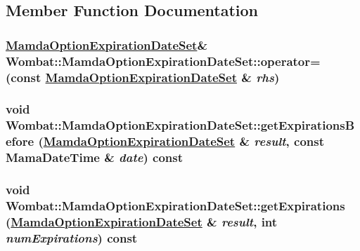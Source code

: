 \subsection{Member Function Documentation}
\hypertarget{classWombat_1_1MamdaOptionExpirationDateSet_44ae713d433431323e784c43f3305e84}{
\subsubsection[operator=]{\setlength{\rightskip}{0pt plus 5cm}\hyperlink{classWombat_1_1MamdaOptionExpirationDateSet}{Mamda\-Option\-Expiration\-Date\-Set}\& Wombat::Mamda\-Option\-Expiration\-Date\-Set::operator= (const \hyperlink{classWombat_1_1MamdaOptionExpirationDateSet}{Mamda\-Option\-Expiration\-Date\-Set} \& {\em rhs})}}
\label{classWombat_1_1MamdaOptionExpirationDateSet_44ae713d433431323e784c43f3305e84}


\hypertarget{classWombat_1_1MamdaOptionExpirationDateSet_a58c1ab06b95af9bbee919d6fe7b373a}{
\subsubsection[getExpirationsBefore]{\setlength{\rightskip}{0pt plus 5cm}void Wombat::Mamda\-Option\-Expiration\-Date\-Set::get\-Expirations\-Before (\hyperlink{classWombat_1_1MamdaOptionExpirationDateSet}{Mamda\-Option\-Expiration\-Date\-Set} \& {\em result}, const Mama\-Date\-Time \& {\em date}) const}}
\label{classWombat_1_1MamdaOptionExpirationDateSet_a58c1ab06b95af9bbee919d6fe7b373a}


\hypertarget{classWombat_1_1MamdaOptionExpirationDateSet_b756b2efe9defc35104d65ef398d378e}{
\subsubsection[getExpirations]{\setlength{\rightskip}{0pt plus 5cm}void Wombat::Mamda\-Option\-Expiration\-Date\-Set::get\-Expirations (\hyperlink{classWombat_1_1MamdaOptionExpirationDateSet}{Mamda\-Option\-Expiration\-Date\-Set} \& {\em result}, int {\em num\-Expirations}) const}}
\label{classWombat_1_1MamdaOptionExpirationDateSet_b756b2efe9defc35104d65ef398d378e}


